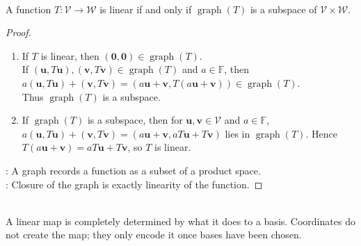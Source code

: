 \begin{proposition} \label{prop:graph-subspace-characterizes-linearity} \\
A function $T:\mathcal{V}\to\mathcal{W}$ is linear if and only if $\operatorname{graph}(T)$ is a subspace of $\mathcal{V}\times\mathcal{W}$.
\begin{proof}
\begin{enumerate}[label=\roman*.]
\setlength{\itemsep}{0pt}
\item[$(\Rightarrow)$] If $T$ is linear, then $(\mathbf{0},\mathbf{0})\in\operatorname{graph}(T)$.\\
If $(\mathbf{u},T\mathbf{u}),(\mathbf{v},T\mathbf{v})\in\operatorname{graph}(T)$ and $a\in\mathbb{F}$, then $a(\mathbf{u},T\mathbf{u})+(\mathbf{v},T\mathbf{v}) =(a\mathbf{u}+\mathbf{v},T(a\mathbf{u}+\mathbf{v}))\in\operatorname{graph}(T)$.\\
Thus $\operatorname{graph}(T)$ is a subspace.
\item[$(\Leftarrow)$] If $\operatorname{graph}(T)$ is a subspace, then for $\mathbf{u},\mathbf{v}\in\mathcal{V}$ and $a\in\mathbb{F}$, $a(\mathbf{u},T\mathbf{u})+(\mathbf{v},T\mathbf{v})=(a\mathbf{u}+\mathbf{v},aT\mathbf{u}+T\mathbf{v})$ lies in $\operatorname{graph}(T)$. Hence $T(a\mathbf{u}+\mathbf{v})=aT\mathbf{u}+T\mathbf{v}$, so $T$ is linear.
\end{enumerate}
: A graph records a function as a subset of a product space.\\
: Closure of the graph is exactly linearity of the function.
\end{proof}
\end{proposition}

\begin{principle} \\
A linear map is completely determined by what it does to a basis. Coordinates do not create the map; they only encode it once bases have been chosen.
\end{principle}

